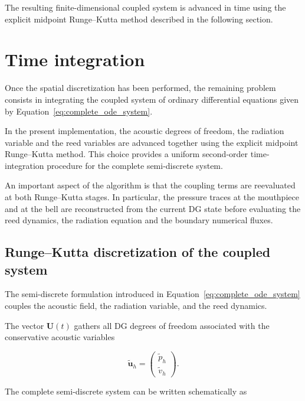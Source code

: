 \documentclass[11pt,a4paper]{report}
\theoremstyle{plain}
\theoremstyle{definition}
\begin{document}
The resulting finite-dimensional coupled system is advanced in time using the
explicit midpoint Runge--Kutta method described in the following section.


\section{Time integration}

Once the spatial discretization has been performed, the remaining problem
consists in integrating the coupled system of ordinary differential equations
given by Equation~\eqref{eq:complete_ode_system}.

In the present implementation, the acoustic degrees of freedom, the radiation
variable and the reed variables are advanced together using the explicit
midpoint Runge--Kutta method. This choice provides a uniform second-order
time-integration procedure for the complete semi-discrete system.

An important aspect of the algorithm is that the coupling terms are
reevaluated at both Runge--Kutta stages. In particular, the pressure traces at
the mouthpiece and at the bell are reconstructed from the current DG state
before evaluating the reed dynamics, the radiation equation and the boundary
numerical fluxes.


\subsection{Runge--Kutta discretization of the coupled system}
\label{subsec:rk2_coupled}

The semi-discrete formulation introduced in
Equation~\eqref{eq:complete_ode_system} couples the acoustic field, the
radiation variable, and the reed dynamics.

The vector \(\mathbf U(t)\) gathers all DG degrees of freedom associated with
the conservative acoustic variables

\begin{equation}
\tilde{\mathbf u}_h
=
\begin{pmatrix}
\tilde p_h\\
\tilde v_h
\end{pmatrix}.
\end{equation}

The complete semi-discrete system can be written schematically as
\end{document}
